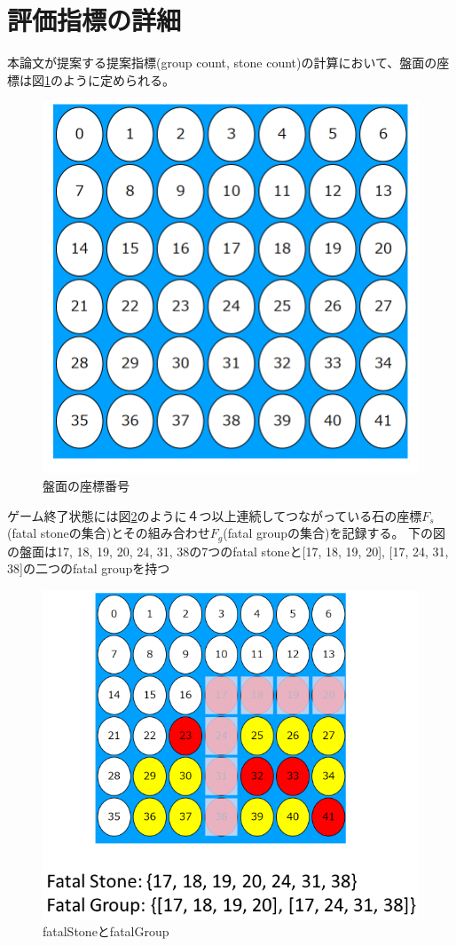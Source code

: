 \section{評価指標の詳細}
本論文が提案する提案指標(group count, stone count)の計算において、盤面の座標は図\ref{fig:index}のように定められる。
\begin{figure}[t]
	\centering
	\includegraphics[trim={0cm 0cm 0cm 0cm},clip]{./figure/index.png}
	\caption{盤面の座標番号}
	\label{fig:index}
\end{figure}
ゲーム終了状態には図\ref{fig:fatalGroup}のように４つ以上連続してつながっている石の座標$F_s$(fatal stoneの集合)とその組み合わせ$F_g$(fatal groupの集合)を記録する。
下の図の盤面は{17, 18, 19, 20, 24, 31, 38}の7つのfatal stoneと{[17, 18, 19, 20], [17, 24, 31, 38]}の二つのfatal groupを持つ
\begin{figure}[t]
	\centering
	\includegraphics[width=\linewidth]{./figure/fatalGroup.png}
	\caption{fatalStoneとfatalGroup}
	\label{fig:fatalGroup}
\end{figure}
